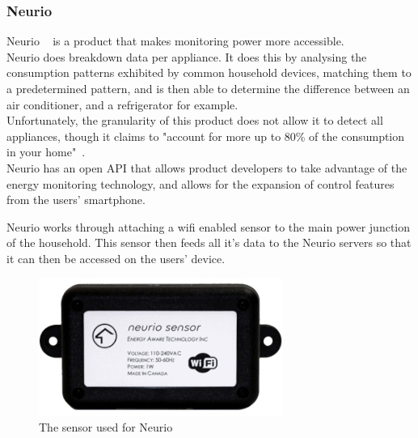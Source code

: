 \documentclass[draft,preprint,12pt,3p]{elsarticle}
\begin{document}
\subsubsection{Neurio}

Neurio ~\cite{neurio} is a product that makes monitoring power more accessible.\\ 
Neurio does breakdown data per appliance. It does this by analysing the consumption patterns exhibited by common household devices, matching them to a predetermined pattern, and is then able to determine the difference between an air conditioner, and a refrigerator for example. \\
Unfortunately, the granularity of this product does not allow it to detect all appliances, though it claims to "account for more up to 80\% of the consumption in your home"~\cite{neurio-detection}.\\ Neurio has an open API that allows product developers to take advantage of the energy monitoring technology, and allows for the expansion of control features from the users' smartphone.

Neurio works through attaching a wifi enabled sensor to the main power junction of the household. This sensor then feeds all it's data to the Neurio servers so that it can then be accessed on the users' device.
\begin{figure}[h]
    \centering
    \includegraphics[width=8cm]{existing/neurio-sensor}
    \caption {The sensor used for Neurio}
\end{figure}
\end{document}
